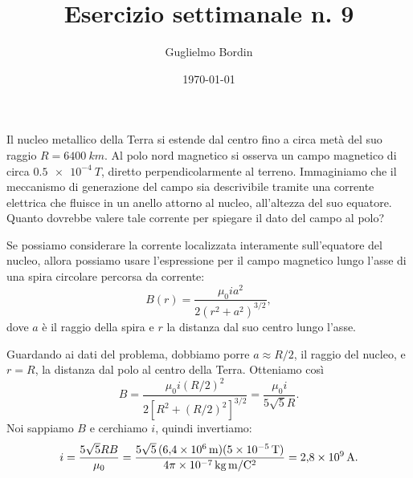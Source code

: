\documentclass[10pt]{gulartcl}
\title{Esercizio settimanale n. 9}
\author{Guglielmo Bordin}
\date{\today}
\begin{document}
\maketitle 

\noindent
Il nucleo metallico della Terra si estende dal centro fino a circa metà del
suo raggio $R = \qty{6400}{km}$. Al polo nord magnetico si osserva un campo
magnetico di circa $\qty{0.5e-4}{T}$, diretto perpendicolarmente al
terreno. Immaginiamo che il meccanismo di generazione del campo sia
descrivibile tramite una corrente elettrica che fluisce in un anello
attorno al nucleo, all’altezza del suo equatore. Quanto dovrebbe valere
tale corrente per spiegare il dato del campo al polo?

\begin{solution}
Se possiamo considerare la corrente localizzata interamente sull’equatore
del nucleo, allora possiamo usare l’espressione per il campo magnetico
lungo l’asse di una spira circolare percorsa da corrente:
\begin{equation}
    B(r) = \frac{\mu_0 i a^2}{2(r^2 + a^2)^{3 / 2}},
\end{equation}
dove $a$ è il raggio della spira e $r$ la distanza dal suo centro lungo
l’asse.

Guardando ai dati del problema, dobbiamo porre $a \approx R / 2$, il
raggio del nucleo, e $r = R$, la distanza dal polo al centro della Terra.
Otteniamo così
\begin{equation}
    B = \frac{\mu_0 i (R / 2)^2}{2[R^2 + (R / 2)^2]^{3 / 2}}
      = \frac{\mu_0 i}{5 \sqrt{5} R}.
\end{equation}
Noi sappiamo $B$ e cerchiamo $i$, quindi invertiamo:
\begin{equation}
    i = \frac{5 \sqrt{5} R B}{\mu_0}
      = \frac{5 \sqrt{5} \, (\qty{6.4e6}{m})(\qty{5e-5}{T})}%
             {\qty{4\pi e-7}{kg.m\per C\squared}}
      = \qty{2.8e9}{A}.
\end{equation}
\end{solution}
\end{document}

